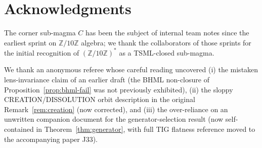 \documentclass[11pt,reqno]{amsart}
\theoremstyle{plain}
\theoremstyle{definition}
\theoremstyle{remark}
\newcommand{\Z}{\mathbb{Z}}
\begin{document}
\section*{Acknowledgments}

The corner sub-magma $C$ has been the subject of internal team notes
since the earliest sprint on $\Z/10\Z$ algebra; we thank the
collaborators of those sprints for the initial recognition of
$(\Z/10\Z)^*$ as a TSML-closed sub-magma.

We thank an anonymous referee whose careful reading uncovered (i) the
mistaken lens-invariance claim of an earlier draft (the BHML
non-closure of Proposition~\ref{prop:bhml-fail} was not previously
exhibited), (ii) the sloppy CREATION/DISSOLUTION orbit description
in the original Remark~\ref{rem:creation} (now corrected), and
(iii) the over-reliance on an unwritten companion document for the
generator-selection result (now self-contained in
Theorem~\ref{thm:generator}, with full TIG flatness reference moved
to the accompanying paper \cite{SandersTIG} J33).
\end{document}
